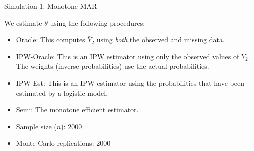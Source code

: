 \documentclass{beamer} %
\begin{document}
\begin{frame}{Simulation 1: Monotone MAR}

    We estimate $\theta$ using the following procedures:

    \begin{itemize}
        \item Oracle: This computes $\bar Y_2$ using \textit{both} the observed
          and missing data.
        \item IPW-Oracle: This is an IPW estimator using only the observed
          values of $Y_2$. The weights (inverse probabilities) use the actual
          probabilities.
        \item IPW-Est: This is an IPW estimator using the probabilities that
          have been estimated by a logistic model.
        \item Semi: The monotone efficient estimator.
    \end{itemize}

    \begin{itemize}
      \item Sample size ($n$): 2000
      \item Monte Carlo replications: 2000
    \end{itemize}

\end{frame}

\begin{frame}

    

\end{frame}

\begin{frame}

    

\end{frame}

\begin{frame}

    

\end{frame}
\end{document}

